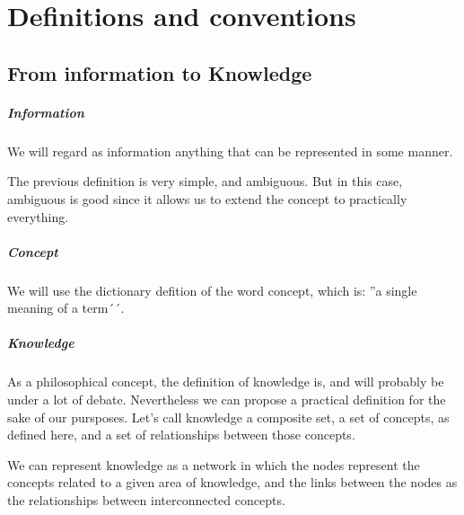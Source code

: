 \chapter{Definitions and conventions}

\section{From information to Knowledge}
\paragraph{Information}
\indent
We will regard as information anything that can be
represented in some manner.
\par

\indent
The previous definition is very simple, and ambiguous.
But in this case, ambiguous is good since it allows
us to extend the concept to practically everything.
\par

\paragraph{Concept}
\indent
We will use the dictionary defition of the word concept, 
which is: ''a single meaning of a term´´.
\par

\paragraph{Knowledge}
\indent
As a philosophical concept, the definition of knowledge is, and
will probably be under a lot of debate. Nevertheless we can
propose a practical definition for the sake of our pursposes.
Let's call knowledge a composite set, a set of concepts, 
as defined here, and a set of relationships between those concepts.
\par

\indent
We can represent knowledge as a network in which the nodes represent
the concepts related to a given area of knowledge, and the 
links between the nodes as the relationships between interconnected
concepts.
\par

